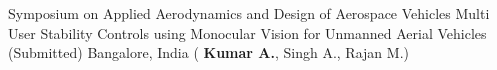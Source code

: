 \begin{cventries}
  \cventry
    { 
Symposium on Applied Aerodynamics and 
Design of Aerospace Vehicles}
    {Multi User Stability Controls using Monocular Vision for Unmanned Aerial Vehicles (Submitted)} {Bangalore, India}
    {}
    {( \textbf{Kumar A.}, Singh A.,  Rajan  M.)}
    {
      \begin{cvitems}
      \end{cvitems}
    }
\end{cventries}
